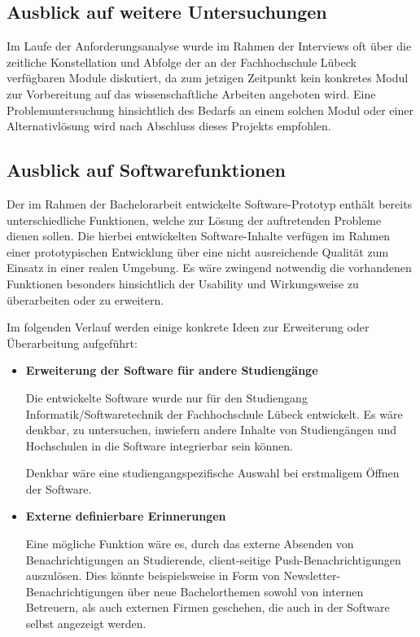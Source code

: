 \documentclass[bibliography=totoc,listof=totoc,BCOR=5mm,DIV=12,oneside]{scrbook}
\begin{document}
{\subsection{Ausblick auf weitere Untersuchungen}
\par Im Laufe der Anforderungsanalyse wurde im Rahmen der Interviews oft über die zeitliche Konstellation und Abfolge der an der Fachhochschule Lübeck verfügbaren Module diskutiert, da zum jetzigen Zeitpunkt kein konkretes Modul zur Vorbereitung auf das wissenschaftliche Arbeiten angeboten wird. Eine Problemuntersuchung hinsichtlich des Bedarfs an einem solchen Modul oder einer Alternativlösung wird nach Abschluss dieses Projekts empfohlen.

\subsection{Ausblick auf Softwarefunktionen}
\par Der im Rahmen der Bachelorarbeit entwickelte Software-Prototyp enthält bereits unterschiedliche Funktionen, welche zur Lösung der auftretenden Probleme dienen sollen. Die hierbei entwickelten Software-Inhalte verfügen im Rahmen einer prototypischen Entwicklung über eine nicht ausreichende Qualität zum Einsatz in einer realen Umgebung. Es wäre zwingend notwendig die vorhandenen Funktionen besonders hinsichtlich der Usability und Wirkungsweise zu überarbeiten oder zu erweitern. 

\par \bigskip Im folgenden Verlauf werden einige konkrete Ideen zur Erweiterung oder Überarbeitung aufgeführt:

\begin{itemize}
\item \textbf{Erweiterung der Software für andere Studiengänge}
\par Die entwickelte Software wurde nur für den Studiengang Informatik/Softwaretechnik der Fachhochschule Lübeck entwickelt. Es wäre denkbar, zu untersuchen, inwiefern andere Inhalte von Studiengängen und Hochschulen in die Software integrierbar sein können.
\par Denkbar wäre eine studiengangspezifische Auswahl bei erstmaligem Öffnen der Software.
\item \textbf{Externe definierbare Erinnerungen}
\par Eine mögliche Funktion wäre es, durch das externe Absenden von Benachrichtigungen an Studierende, client-seitige Push-Benachrichtigungen auszulösen. Dies könnte beispielsweise in Form von Newsletter-Benachrichtigungen über neue Bachelorthemen sowohl von internen Betreuern, als auch externen Firmen geschehen, die auch in der Software selbst angezeigt werden.


\end{itemize}}
\end{document}
